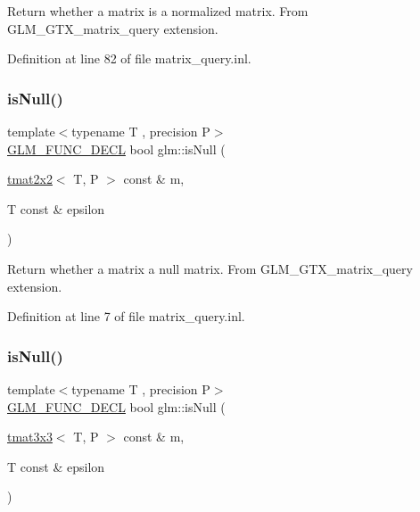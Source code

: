 Return whether a matrix is a normalized matrix. From G\+L\+M\+\_\+\+G\+T\+X\+\_\+matrix\+\_\+query extension. 

Definition at line 82 of file matrix\+\_\+query.\+inl.

\mbox{\label{group__gtx__matrix__query_ga37e535cbeaea383b8c1247b98875cd4b}} 
\subsubsection{\texorpdfstring{isNull()}{isNull()}\hspace{0.1cm}{\footnotesize\ttfamily [1/3]}}
{\footnotesize\ttfamily template$<$typename T , precision P$>$ \\
\mbox{\hyperlink{setup_8hpp_ab2d052de21a70539923e9bcbf6e83a51}{G\+L\+M\+\_\+\+F\+U\+N\+C\+\_\+\+D\+E\+CL}} bool glm\+::is\+Null (\begin{DoxyParamCaption}\item[{\mbox{\hyperlink{structglm_1_1tmat2x2}{tmat2x2}}$<$ T, P $>$ const \&}]{m,  }\item[{T const \&}]{epsilon }\end{DoxyParamCaption})}

Return whether a matrix a null matrix. From G\+L\+M\+\_\+\+G\+T\+X\+\_\+matrix\+\_\+query extension. 

Definition at line 7 of file matrix\+\_\+query.\+inl.

\mbox{\label{group__gtx__matrix__query_gac67a5c7e029a84b74b02ac9599b8972d}} 
\subsubsection{\texorpdfstring{isNull()}{isNull()}\hspace{0.1cm}{\footnotesize\ttfamily [2/3]}}
{\footnotesize\ttfamily template$<$typename T , precision P$>$ \\
\mbox{\hyperlink{setup_8hpp_ab2d052de21a70539923e9bcbf6e83a51}{G\+L\+M\+\_\+\+F\+U\+N\+C\+\_\+\+D\+E\+CL}} bool glm\+::is\+Null (\begin{DoxyParamCaption}\item[{\mbox{\hyperlink{structglm_1_1tmat3x3}{tmat3x3}}$<$ T, P $>$ const \&}]{m,  }\item[{T const \&}]{epsilon }\end{DoxyParamCaption})}

